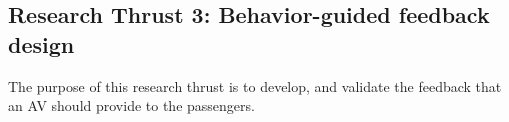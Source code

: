 \subsection{Research Thrust 3: Behavior-guided feedback design}
\label{sec:feedback}

The purpose of this research thrust is to develop, and validate the feedback that an AV should provide to the passengers.
